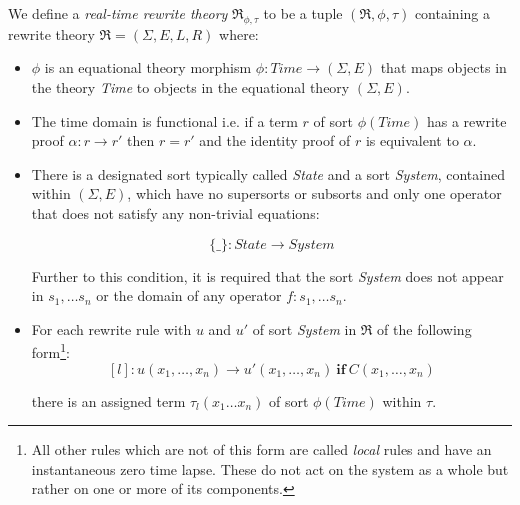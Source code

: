 \medskip
\begin{mydef}
We define a \emph{real-time rewrite theory} $\mathfrak{R}_{\phi,\tau}$ to be a tuple $(\mathfrak{R}, \phi,\tau)$ containing a rewrite theory $\mathfrak{R} = (\Sigma, E,L,R) $ where:

\begin{itemize}
\item $\phi$ is an equational theory morphism $\phi : \mathit{Time} \to (\Sigma, E)$ that maps objects in the theory \textit{Time} to objects in the equational theory $(\Sigma , E)$.

\item The time domain is functional i.e. if a term $r$ of sort $\phi(Time)$  has a rewrite proof $\alpha: r \to r'$ then $r = r'$ and the identity proof of $r$ is equivalent to $\alpha$.

\item There is a designated sort typically called \textit{State} and a sort \textit{System}, contained within $(\Sigma, E)$, which have no supersorts or subsorts and only one operator that does not satisfy any non-trivial equations:

$$\{\_\}: State \to System$$

Further to this condition, it is required that the sort \textit{System} does not appear in $s_1, \ldots s_n$  or the domain  of  any operator $f: s_1, \ldots s_n$.

\item For each rewrite rule with $u$ and $u'$ of sort \textit{System} in $\mathfrak{R}$ of the following form\footnote{All other rules which are not of this form are called \emph{local} rules and have an instantaneous zero time lapse. These do not act on the system as a whole but rather on one or more of its components.}:
$$[l]: u(x_1,\ldots ,x_n) \to u'(x_1,\ldots ,x_n) \ \textbf{if} \ C(x_1, \ldots ,x_n)$$


there is an assigned term $\tau_l(x_1 \ldots x_n)$ of sort $\phi(Time)$ within $\tau$.

\end{itemize}
\end{mydef}




